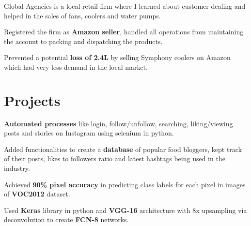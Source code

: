 \documentclass[]{deedy-resume-reversed}
\begin{document}
\begin{minipage}[t]{0.60\textwidth}
\begin{tightemize}
\item Global Agencies is a local retail firm where I learned about customer dealing and helped in the sales of fans, coolers and water pumps.
\item Registered the firm as \textbf{Amazon seller}, handled all operations from maintaining the account to packing and dispatching the products.
\item Prevented a potential \textbf{loss of \rupee2.4L} by selling Symphony coolers on Amazon which had very less demand in the local market.
\end{tightemize}
\sectionsep


\section{Projects}
\descript{}
\begin{tightemize}
\item \textbf{Automated processes} like login, follow/unfollow, searching, liking/viewing posts and stories on Instagram using selenium in python.
\item Added functionalities to create a \textbf{database} of popular food bloggers, kept track of their posts, likes to followers ratio and latest hashtags being used in the industry.
\end{tightemize}
\sectionsep

\descript{}
\begin{tightemize}
\item Achieved \textbf{90\% pixel accuracy} in predicting class labels for each pixel in images of \textbf{VOC2012} dataset.
\item Used \textbf{Keras} library in python and \textbf{VGG-16} architecture with 8x upsampling via deconvolution to create \textbf{FCN-8} networks.
\end{tightemize}
\sectionsep



\end{minipage}
\end{document}
